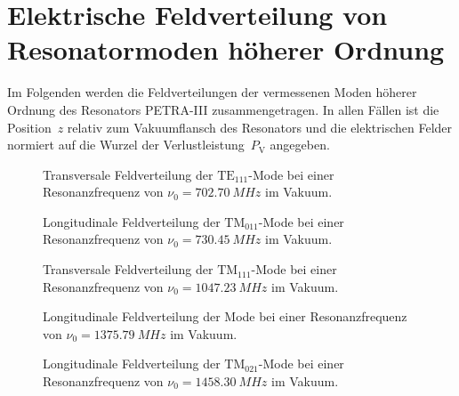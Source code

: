 \section{Elektrische Feldverteilung von Resonatormoden höherer Ordnung}
\label{app:hom_felder}
\FloatBarrier
Im Folgenden werden die Feldverteilungen der vermessenen Moden höherer Ordnung des Resonators PETRA-III zusammengetragen.
In allen Fällen ist die Position~$z$ relativ zum Vakuumflansch des Resonators und die elektrischen Felder normiert auf die Wurzel der Verlustleistung~$P_\mathrm{V}$ angegeben.
\begin{figure}[h]
  \centering
  
  \caption[Transversale Feldverteilung der $\mathrm{TE}_{111}$-Mode \mbox{$\nu_0 = \SI{702.70}{MHz}$}]{Transversale Feldverteilung der $\mathrm{TE}_{111}$-Mode bei einer Resonanzfrequenz von \mbox{$\nu_0 = \SI{702.70}{MHz}$} im Vakuum.}
\end{figure}

\begin{figure}[p]
	\centering
	
	
	\caption[Longitudinale Feldverteilung der $\mathrm{TM}_{011}$-Mode \mbox{$\nu_0 = \SI{730.45}{MHz}$}]{Longitudinale Feldverteilung der $\mathrm{TM}_{011}$-Mode bei einer Resonanzfrequenz von \mbox{$\nu_0 = \SI{730.45}{MHz}$} im Vakuum.}
	
	
	\caption[Transversale Feldverteilung der $\mathrm{TM}_{111}$-Mode \mbox{$\nu_0 = \SI{1047.23}{MHz}$}]{Transversale Feldverteilung der $\mathrm{TM}_{111}$-Mode bei einer Resonanzfrequenz von \mbox{$\nu_0 = \SI{1047.23}{MHz}$} im Vakuum.}
\end{figure}

\begin{figure}[p]
	\centering
	
	
	\caption[Longitudinale Feldverteilung der Mode \mbox{$\nu_0 = \SI{1375.79}{MHz}$}]{Longitudinale Feldverteilung der Mode bei einer Resonanzfrequenz von \mbox{$\nu_0 = \SI{1375.79}{MHz}$} im Vakuum.}
	
    
    \caption[Longitudinale Feldverteilung der $\mathrm{TM}_{021}$-Mode \mbox{$\nu_0 = \SI{1458.30}{MHz}$}]{Longitudinale Feldverteilung der $\mathrm{TM}_{021}$-Mode bei einer Resonanzfrequenz von \mbox{$\nu_0 = \SI{1458.30}{MHz}$} im Vakuum.}
    \label{fig:tm021_1458}
\end{figure}

